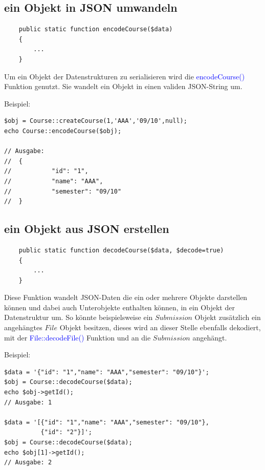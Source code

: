\documentclass[10pt,a4paper,final,parskip]{scrartcl}
\newcommand{\blau}[1]{\textcolor{blue}{#1}}
\begin{document}
\subsection{ein Objekt in JSON umwandeln}
\begin{minipage}{\textwidth}
\begin{lstlisting}
    public static function encodeCourse($data)
    {
    	...
    }
\end{lstlisting}
\end{minipage}

Um ein Objekt der Datenstrukturen zu serialisieren wird die \blau{encodeCourse()} Funktion genutzt. Sie wandelt ein Objekt in einen validen JSON-String um.

\begin{minipage}{\textwidth}
Beispiel:
\begin{lstlisting}
$obj = Course::createCourse(1,'AAA','09/10',null);
echo Course::encodeCourse($obj);

// Ausgabe: 
//	{
//           "id": "1",
//           "name": "AAA",
//           "semester": "09/10"
//	}
\end{lstlisting}
\end{minipage}

\subsection{ein Objekt aus JSON erstellen}
\begin{minipage}{\textwidth}
\begin{lstlisting}
    public static function decodeCourse($data, $decode=true)
    {
    	...
    }
\end{lstlisting}
\end{minipage}

Diese Funktion wandelt JSON-Daten die ein oder mehrere Objekte darstellen können und dabei auch Unterobjekte enthalten können, in ein Objekt der Datenstruktur um. So könnte beispielsweise ein $Submission$ Objekt zusätzlich ein angehängtes $File$ Objekt besitzen, dieses wird an dieser Stelle ebenfalls dekodiert, mit der \blau{File::decodeFile()} Funktion und an die $Submission$ angehängt.

\begin{minipage}{\textwidth}
Beispiel:
\begin{lstlisting}
$data = '{"id": "1","name": "AAA","semester": "09/10"}';
$obj = Course::decodeCourse($data);
echo $obj->getId();
// Ausgabe: 1

$data = '[{"id": "1","name": "AAA","semester": "09/10"},
          {"id": "2"}]';
$obj = Course::decodeCourse($data);
echo $obj[1]->getId();
// Ausgabe: 2
\end{lstlisting}
\end{minipage}
\end{document}
